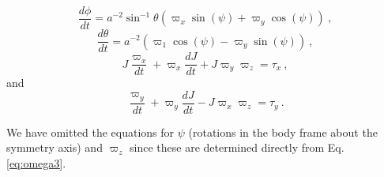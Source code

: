 \begin{equation}
\frac{d\phi}{dt} = a^{-2}\sin^{-1}{\theta} \left (\varpi_x\sin(\psi) + \varpi_y \cos(\psi)\right )~,
\end{equation}
\begin{equation}
\frac{d\theta}{dt} = a^{-2}\left (  \varpi_1\cos(\psi) - \varpi_y \sin(\psi)\right )~,
\end{equation}
\begin{equation}
J\frac{\varpi_x}{dt} + \varpi_x\frac{dJ}{dt}
+ J\varpi_y\varpi_z
=  \tau_x~,
\end{equation}
and
\begin{equation}
\frac{\varpi_y}{dt} + \varpi_y\frac{dJ}{dt}
- J\varpi_x\varpi_z
=  \tau_y~.
\end{equation}

\noindent We have omitted the equations for $\psi$ (rotations in the body frame about the symmetry axis) and $\varpi_z$ since these are determined directly from Eq.\,\ref{eq:omega3}.   



